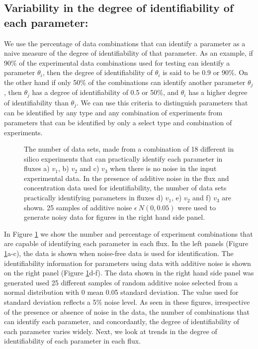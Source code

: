 \documentclass[10pt]{article}
\begin{document}
\subsection{Variability in the degree of identifiability of each parameter:}
We use the percentage of data combinations that can identify a parameter as a naive measure of the degree of identifiability of that parameter. As an example, if 90\% of the experimental data combinations used for testing can identify a parameter $\theta_i$, then the degree of identifiability of $\theta_i$ is said to be 0.9 or 90\%. On the other hand if only 50\% of the combinations can identify another parameter $\theta_j$, then $\theta_j$ has a degree of identifiability of 0.5 or 50\%, and $\theta_i$ has a higher degree of identifiability than $\theta_j$. We can use this criteria to distinguish parameters that can be identified by any type and any combination of experiments from parameters that can be identified by only a select type and combination of experiments.
\begin{figure}[!tbhp]
	\caption{The number of data sets, made from a combination of 18 different in silico experiments that can practically identify each parameter in fluxes a) $v_1$, b) $v_2$ and c) $v_3$ when there is no noise in the input experimental data. In the presence of additive noise in the flux and concentration data used for identifiability, the number of data sets practically identifying parameters in fluxes d) $v_1$, e) $v_2$ and f) $v_3$ are shown. 25 samples of additive noise $\epsilon ~ N(0, 0.05)$ were used to generate noisy data for figures in the right hand side panel.}\label{fig:figure1}
\end{figure}


In Figure \ref{fig:figure1} we show the number and percentage of experiment combinations that are capable of identifying each parameter in each flux. In the left panels (Figure \ref{fig:figure1}a-c), the data is shown when noise-free data is used for identification. The identifiability information for parameters using data with additive noise is shown on the right panel (Figure \ref{fig:figure1}d-f). The data shown in the right hand side panel was generated used 25 different samples of random additive noise selected from a normal distribution with 0 mean 0.05 standard deviation. The value used for standard deviation reflects a 5\% noise level. As seen in these figures, irrespective of the presence or absence of noise in the data, the number of combinations that can identify each parameter, and concordantly, the degree of identifiability of each parameter varies widely. Next, we look at trends in the degree of identifiability of each parameter in each flux.
\end{document}

